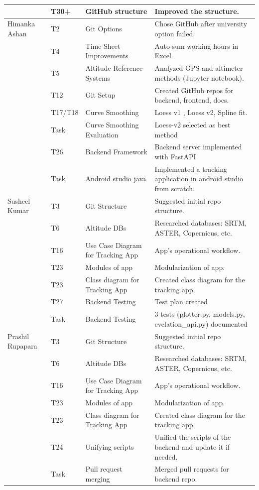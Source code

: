 \documentclass[12pt]{article}
\begin{document}
\begin{longtable}{p{3cm} p{1.5cm} p{4cm} p{7cm}}
& T30+ & GitHub structure & Improved the structure. \\
\midrule
Himanka Ashan & T2 & Git Options & Chose GitHub after university option failed. \\
& T4 & Time Sheet Improvements & Auto-sum working hours in Excel. \\
& T5 & Altitude Reference Systems & Analyzed GPS and altimeter methods (Jupyter notebook). \\
& T12 & Git Setup & Created GitHub repos for backend, frontend, docs. \\
& T17/T18 & Curve Smoothing & Loess v1 , Loess v2, Spline fit. \\
& Task & Curve Smoothing Evaluation & Loess-v2 selected as best method \\
& T26 & Backend Framework & Backend server implemented with FastAPI \\
& Task & Android studio java & Implemented a tracking application in android studio from scratch. \\
\midrule
Susheel Kumar & T3 & Git Structure & Suggested initial repo structure. \\
& T6 & Altitude DBs & Researched databases: SRTM, ASTER, Copernicus, etc. \\
& T16 & Use Case Diagram for Tracking App & App’s operational workflow. \\
& T23 & Modules of app & Modularization of app. \\
& T23 & Class diagram for Tracking App &  Created class diagram for the tracking app. \\
& T27 & Backend Testing & Test plan created  \\
& Task & Backend Testing & 3 tests (plotter.py, models.py, evelation\_api.py) documented  \\
\midrule
Prashil Rupapara & T3 & Git Structure & Suggested initial repo structure. \\
& T6 & Altitude DBs & Researched databases: SRTM, ASTER, Copernicus, etc. \\
& T16 & Use Case Diagram for Tracking App & App’s operational workflow. \\
& T23 & Modules of app & Modularization of app. \\
& T23 & Class diagram for Tracking App &  Created class diagram for the tracking app. \\
& T24 & Unifying scripts & Unified the scripts of the backend and update it if needed. \\
& Task & Pull request merging & Merged pull requests for backend repo. \\

\end{longtable}
\end{document}
